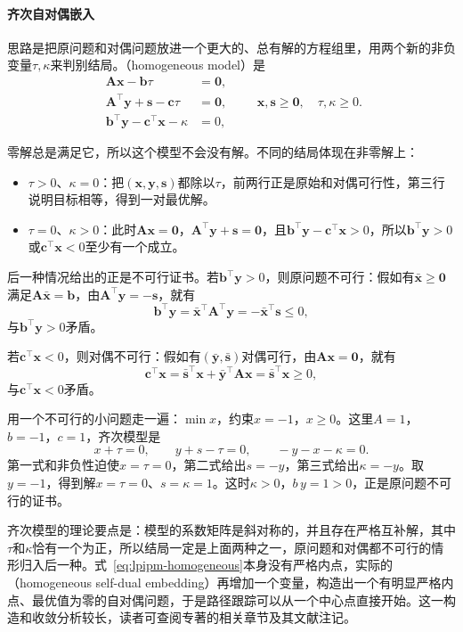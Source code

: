 \paragraph{齐次自对偶嵌入}
思路是把原问题和对偶问题放进一个更大的、总有解的方程组里，用两个新的非负变量$\tau,\kappa$来判别结局。（homogeneous model）是
\begin{equation}
 \begin{aligned}
 \bm{A}\bm{x}-\bm{b}\tau&=\bm{0},\\
 \bm{A}^\top\bm{y}+\bm{s}-\bm{c}\tau&=\bm{0},\\
 \bm{b}^\top\bm{y}-\bm{c}^\top\bm{x}-\kappa&=0,
 \end{aligned}
 \qquad\bm{x},\bm{s}\geq\bm{0},\quad\tau,\kappa\geq0.
 \label{eq:lpipm-homogeneous}
\end{equation}

零解总是满足它，所以这个模型不会没有解。不同的结局体现在非零解上：

\begin{itemize}
 \item $\tau>0$、$\kappa=0$：把$(\bm{x},\bm{y},\bm{s})$都除以$\tau$，前两行正是原始和对偶可行性，第三行说明目标相等，得到一对最优解。
 \item $\tau=0$、$\kappa>0$：此时$\bm{A}\bm{x}=\bm{0}$，$\bm{A}^\top\bm{y}+\bm{s}=\bm{0}$，且$\bm{b}^\top\bm{y}-\bm{c}^\top\bm{x}>0$，所以$\bm{b}^\top\bm{y}>0$或$\bm{c}^\top\bm{x}<0$至少有一个成立。
\end{itemize}

后一种情况给出的正是不可行证书。若$\bm{b}^\top\bm{y}>0$，则原问题不可行：假如有$\bar{\bm{x}}\geq\bm{0}$满足$\bm{A}\bar{\bm{x}}=\bm{b}$，由$\bm{A}^\top\bm{y}=-\bm{s}$，就有
\[
 \bm{b}^\top\bm{y}=\bar{\bm{x}}^\top\bm{A}^\top\bm{y}=-\bar{\bm{x}}^\top\bm{s}\leq0,
\]
与$\bm{b}^\top\bm{y}>0$矛盾。

若$\bm{c}^\top\bm{x}<0$，则对偶不可行：假如有$(\bar{\bm{y}},\bar{\bm{s}})$对偶可行，由$\bm{A}\bm{x}=\bm{0}$，就有
\[
 \bm{c}^\top\bm{x}=\bar{\bm{s}}^\top\bm{x}+\bar{\bm{y}}^\top\bm{A}\bm{x}=\bar{\bm{s}}^\top\bm{x}\geq0,
\]
与$\bm{c}^\top\bm{x}<0$矛盾。

用一个不可行的小问题走一遍：$\min x$，约束$x=-1$，$x\geq0$。这里$A=1$，$b=-1$，$c=1$，齐次模型是
\[
 x+\tau=0,\qquad y+s-\tau=0,\qquad -y-x-\kappa=0.
\]
第一式和非负性迫使$x=\tau=0$，第二式给出$s=-y$，第三式给出$\kappa=-y$。取$y=-1$，得到解$x=\tau=0$、$s=\kappa=1$。这时$\kappa>0$，$b\,y=1>0$，正是原问题不可行的证书。

齐次模型的理论要点是：模型的系数矩阵是斜对称的，并且存在严格互补解，其中$\tau$和$\kappa$恰有一个为正，所以结局一定是上面两种之一，原问题和对偶都不可行的情形归入后一种。式~\eqref{eq:lpipm-homogeneous}本身没有严格内点，实际的（homogeneous self-dual embedding）再增加一个变量，构造出一个有明显严格内点、最优值为零的自对偶问题，于是路径跟踪可以从一个中心点直接开始。这一构造和收敛分析较长，读者可查阅专著的相关章节及其文献注记。

